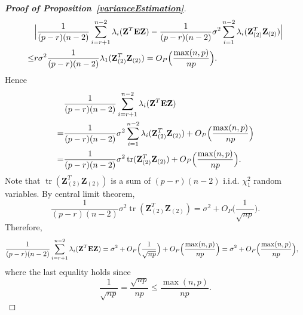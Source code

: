 \documentclass[review]{elsarticle}
\DeclareMathOperator{\mytr}{tr}
\newcommand{\bZ}{\mathbf{Z}}
\theoremstyle{plain}
\theoremstyle{definition}
\theoremstyle{remark}
\begin{document}
\begin{proof}[\textbf{Proof of Proposition~\ref{varianceEstimation}}]
     \begin{equation*}
         \begin{aligned}
             &\Big|\frac{1}{(p-r)(n-2)}\sum_{i=r+1}^{n-2}\lambda_i(\bZ^T \BE \bZ)-
    \frac{1}{(p-r)(n-2)} \sigma^2\sum_{i=1}^{n-2}\lambda_{i}(\bZ_{(2)}^T \bZ_{(2)})\Big|
             \\
             \leq & r\sigma^2\frac{1}{(p-r)(n-2)} \lambda_1 (\bZ_{(2)}^T \bZ_{(2)})=O_P\Big(\frac{\max(n,p)}{np}\Big).
         \end{aligned}
     \end{equation*}
    Hence
     \begin{equation*}
         \begin{aligned}
             &\frac{1}{(p-r)(n-2)}\sum_{i=r+1}^{n-2}\lambda_i(\bZ^T \BE \bZ)\\
             =&
    \frac{1}{(p-r)(n-2)} \sigma^2\sum_{i=1}^{n-2}\lambda_{i}(\bZ_{(2)}^T \bZ_{(2)})
             +O_P\Big(\frac{\max(n,p)}{np}\Big)\\
             =&
             \frac{1}{(p-r)(n-2)} \sigma^2\mytr(\bZ_{(2)}^T \bZ_{(2)})
             +O_P\Big(\frac{\max(n,p)}{np}\Big).
         \end{aligned}
     \end{equation*}
     Note that $\mytr(\bZ_{(2)}^T \bZ_{(2)})$ is a sum of $(p-r)(n-2)$ i.i.d. $\chi^2_1$ random variables.
     By central limit theorem,
     $$
             \frac{1}{(p-r)(n-2)} \sigma^2\mytr(\bZ_{(2)}^T \bZ_{(2)})
             =\sigma^2+O_P\Big(\frac{1}{\sqrt{np}}\Big).
     $$
     Therefore,
     \begin{equation*}
         \begin{aligned}
             &\frac{1}{(p-r)(n-2)}\sum_{i=r+1}^{n-2}\lambda_i(\bZ^T \BE \bZ)=
             \sigma^2
             +O_P\Big(\frac{1}{\sqrt{np}}\Big)
             +O_P\Big(\frac{\max(n,p)}{np}\Big)
             =
             \sigma^2
             +O_P\Big(\frac{\max(n,p)}{np}\Big),
         \end{aligned}
     \end{equation*}
     where the last equality holds since
     $$
    \frac{1}{\sqrt{np}} =
    \frac{\sqrt{np}}{np} \leq
    \frac{\max(n,p)}{np}.
     $$
\end{proof}
\end{document}
